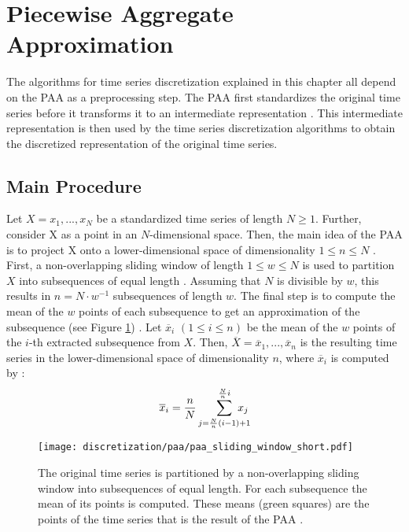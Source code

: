 \section{Piecewise Aggregate Approximation}
The algorithms for time series discretization explained in this chapter all depend on the \ac{PAA} as a preprocessing step. The \ac{PAA} first standardizes the original time series before it transforms it to an intermediate representation \cite{PAA_Keogh}. This intermediate representation is then used by the time series discretization algorithms to obtain the discretized representation of the original time series. \newline
\subsection*{Main Procedure}
Let $X = x_1, ..., x_N$ be a standardized time series of length $N \geq 1$. Further, consider X as a point in an $N$-dimensional space. Then, the main idea of the \ac{PAA} is to project X onto a lower-dimensional space of dimensionality $1 \leq n \leq N$ \cite{PAA_Keogh}. \newline
First, a non-overlapping sliding window of length $1 \leq w \leq N$ is used to partition $X$ into subsequences of equal length \cite{PAA_Keogh}. Assuming that $N$ is divisible by $w$, this results in $n = N \cdot w^{-1}$ subsequences of length $w$. The final step is to compute the mean of the $w$ points of each subsequence to get an approximation of the subsequence (see Figure \ref{fig:PAA}) \cite{PAA_Yi_Faloutsos}. \newline
Let $\overline{x}_i$ $(1 \leq i \leq n)$ be the mean of the $w$ points of the $i$-th extracted subsequence from $X$. Then, $\overline{X} = \overline{x}_1, ..., \overline{x}_n$ is the resulting time series in the lower-dimensional space of dimensionality $n$, where $\overline{x}_i$ is computed by \cite{PAA_Keogh}:
\begin{equation}
\overline{x}_i = \frac{n}{N} \sum_{j=\frac{N}{n}(i-1)+1}^{\frac{N}{n}i}\mkern-24mu x_j
\end{equation}
\begin{figure}[htb]
\centering
\texttt{[image: discretization/paa/paa\_sliding\_window\_short.pdf]}
\caption[Piecewise Aggregate Approximation - Sliding Window]{The original time series is partitioned by a non-overlapping sliding window into subsequences of equal length. For each subsequence the mean of its points is computed. These means (green squares) are the points of the time series that is the result of the \ac{PAA} \cite{PAA_Keogh}.} 
\label{fig:PAA}
\end{figure}
